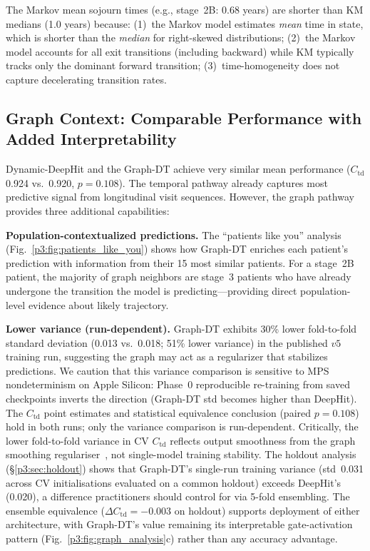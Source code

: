 The Markov mean sojourn times (e.g., stage~2B: 0.68 years) are shorter than KM medians (1.0 years) because: (1)~the Markov model estimates \textit{mean} time in state, which is shorter than the \textit{median} for right-skewed distributions; (2)~the Markov model accounts for all exit transitions (including backward) while KM typically tracks only the dominant forward transition; (3)~time-homogeneity does not capture decelerating transition rates.

\subsection{Graph Context: Comparable Performance with Added Interpretability}

Dynamic-DeepHit and the Graph-DT achieve very similar mean performance ($C_\text{td}$ 0.924 vs.\ 0.920, $p{=}0.108$). The temporal pathway already captures most predictive signal from longitudinal visit sequences. However, the graph pathway provides three additional capabilities:

\textbf{Population-contextualized predictions.} The ``patients like you'' analysis (Fig.~\ref{p3:fig:patients_like_you}) shows how Graph-DT enriches each patient's prediction with information from their 15 most similar patients. For a stage~2B patient, the majority of graph neighbors are stage~3 patients who have already undergone the transition the model is predicting---providing direct population-level evidence about likely trajectory.

\textbf{Lower variance (run-dependent).} Graph-DT exhibits 30\% lower fold-to-fold standard deviation (0.013 vs.\ 0.018; 51\% lower variance) in the published $v5$ training run, suggesting the graph may act as a regularizer that stabilizes predictions. We caution that this variance comparison is sensitive to MPS nondeterminism on Apple Silicon: Phase~0 reproducible re-training from saved checkpoints inverts the direction (Graph-DT std becomes higher than DeepHit). The $C_\text{td}$ point estimates and statistical equivalence conclusion (paired $p{=}0.108$) hold in both runs; only the variance comparison is run-dependent. Critically, the lower fold-to-fold variance in CV $C_\text{td}$ reflects output smoothness from the graph smoothing regulariser~\cite{velickovic2018}, not single-model training stability. The holdout analysis (\S\ref{p3:sec:holdout}) shows that Graph-DT's single-run training variance (std~0.031 across CV initialisations evaluated on a common holdout) exceeds DeepHit's (0.020), a difference practitioners should control for via 5-fold ensembling. The ensemble equivalence ($\Delta C_\text{td} = {-}0.003$ on holdout) supports deployment of either architecture, with Graph-DT's value remaining its interpretable gate-activation pattern (Fig.~\ref{p3:fig:graph_analysis}c) rather than any accuracy advantage.

